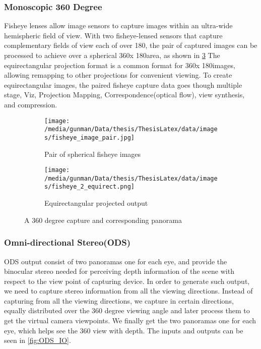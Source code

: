 \subsubsection{Monoscopic 360 Degree}
Fisheye lenses allow image sensors to capture images within an ultra-wide hemispheric field of view. With two fisheye-lensed sensors that capture complementary fields of view each of over 180\textdegree , the pair of captured images can be processed to achieve over a spherical 360\textdegree  x 180\textdegree  area, as shown in \ref{fig:Mono} The equirectangular projection format is a common format for 360\textdegree  x 180\textdegree  images, allowing remapping to other projections for convenient viewing. To create equirectangular images, the paired fisheye capture data  goes though multiple stage, Viz, Projection Mapping, Correspondence(optical flow), view synthesis, and compression.
\begin{figure}[h]
	\centering
	\begin{subfigure}{.5\textwidth}
		\centering
		\texttt{[image: /media/gunman/Data/thesis/ThesisLatex/data/images/fisheye\_image\_pair.jpg]}
		\caption{Pair of spherical fisheye images}
		\label{fig:Mono input}
	\end{subfigure}%
	\begin{subfigure}{.5\textwidth}
		\centering
		\texttt{[image: /media/gunman/Data/thesis/ThesisLatex/data/images/fisheye\_2\_equirect.png]}
		\caption{Equirectangular projected output}
		\label{fig:Mono Output}
	\end{subfigure}
	\caption{A 360 degree capture and corresponding panorama}
	\label{fig:Mono}
\end{figure}



\subsubsection{Omni-directional Stereo(ODS)}
ODS output consist of two panoramas one for each eye, and provide the binocular stereo needed for perceiving depth information of the scene with respect to the view point of capturing device. In order to generate such output, we need to capture stereo information from all the viewing directions. Instead of capturing from all the viewing directions, we capture in certain directions, equally distributed over the 360 degree viewing angle and later process them to get the virtual camera viewpoints. We finally get the two panoramas one for each eye, which helps see the 360 view with depth. The inputs and outputs can be seen in \ref{fig:ODS_IO}.




